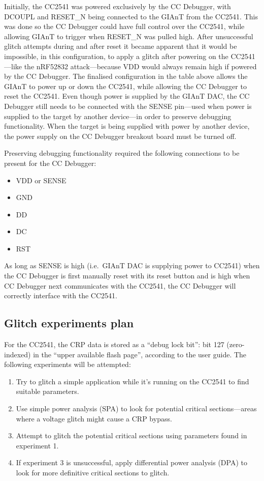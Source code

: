 Initially, the CC2541 was powered exclusively by the CC Debugger, with
DCOUPL and RESET\_N being connected to the GIAnT from the CC2541. This
was done so the CC Debugger could have full control over the CC2541,
while allowing GIAnT to trigger when RESET\_N was pulled high. After
unsuccessful glitch attempts during and after reset it became apparent
that it would be impossible, in this configuration, to apply a glitch
after powering on the CC2541---like the nRF52832 attack---because VDD
would always remain high if powered by the CC Debugger. The finalised
configuration in the table above allows the GIAnT to power up or down
the CC2541, while allowing the CC Debugger to reset the CC2541. Even
though power is supplied by the GIAnT DAC, the CC Debugger still needs
to be connected with the SENSE pin---used when power is supplied to the
target by another device---in order to preserve debugging functionality.
When the target is being supplied with power by another device, the
power supply on the CC Debugger breakout board must be turned off.

Preserving debugging functionality required the following connections to
be present for the CC Debugger:

\begin{itemize}
\tightlist
\item
  VDD or SENSE
\item
  GND
\item
  DD
\item
  DC
\item
  RST
\end{itemize}

As long as SENSE is high (i.e.~GIAnT DAC is supplying power to CC2541)
when the CC Debugger is first manually reset with its reset button and
is high when CC Debugger next communicates with the CC2541, the CC
Debugger will correctly interface with the CC2541.

\hypertarget{glitch-experiments-plan}{%
\subsection{Glitch experiments plan}\label{glitch-experiments-plan}}

For the CC2541, the CRP data is stored as a ``debug lock bit'': bit 127
(zero-indexed) in the ``upper available flash page'', according to the
user guide. The following experiments will be attempted:

\begin{enumerate}
\def\labelenumi{\arabic{enumi}.}
\tightlist
\item
  Try to glitch a simple application while it's running on the CC2541 to
  find suitable parameters.
\item
  Use simple power analysis (SPA) to look for potential critical
  sections---areas where a voltage glitch might cause a CRP bypass.
\item
  Attempt to glitch the potential critical sections using parameters
  found in experiment 1.
\item
  If experiment 3 is unsuccessful, apply differential power analysis
  (DPA) to look for more definitive critical sections to glitch.
\end{enumerate}

